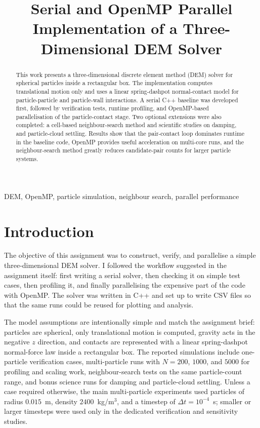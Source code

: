 \documentclass[conference]{IEEEtran}
\title{Serial and OpenMP Parallel Implementation of a Three-Dimensional DEM Solver}
\author{\IEEEauthorblockN{Praveen Kumar Jha}
\IEEEauthorblockA{HPSC 2026\\
Assignment 1}}
\begin{document}
\maketitle

\begin{abstract}
This work presents a three-dimensional discrete element method (DEM) solver for spherical particles inside a rectangular box. The implementation computes translational motion only and uses a linear spring-dashpot normal-contact model for particle-particle and particle-wall interactions. A serial C++ baseline was developed first, followed by verification tests, runtime profiling, and OpenMP-based parallelisation of the particle-contact stage. Two optional extensions were also completed: a cell-based neighbour-search method and scientific studies on damping, and particle-cloud settling. Results show that the pair-contact loop dominates runtime in the baseline code, OpenMP provides useful acceleration on multi-core runs, and the neighbour-search method greatly reduces candidate-pair counts for larger particle systems.
\end{abstract}

\begin{IEEEkeywords}
DEM, OpenMP, particle simulation, neighbour search, parallel performance
\end{IEEEkeywords}

\section{Introduction}
The objective of this assignment was to construct, verify, and parallelise a simple three-dimensional DEM solver. I followed the workflow suggested in the assignment itself: first writing a serial solver, then checking it on simple test cases, then profiling it, and finally parallelising the expensive part of the code with OpenMP. The solver was written in C++ and set up to write CSV files so that the same runs could be reused for plotting and analysis.

The model assumptions are intentionally simple and match the assignment brief: particles are spherical, only translational motion is computed, gravity acts in the negative $z$ direction, and contacts are represented with a linear spring-dashpot normal-force law inside a rectangular box. The reported simulations include one-particle verification cases, multi-particle runs with $N=200$, $1000$, and $5000$ for profiling and scaling work, neighbour-search tests on the same particle-count range, and bonus science runs for damping and particle-cloud settling. Unless a case required otherwise, the main multi-particle experiments used particles of radius $0.015$~m, density $2400$~kg/m$^3$, and a timestep of $\Delta t = 10^{-4}$~s; smaller or larger timesteps were used only in the dedicated verification and sensitivity studies.
\end{document}
